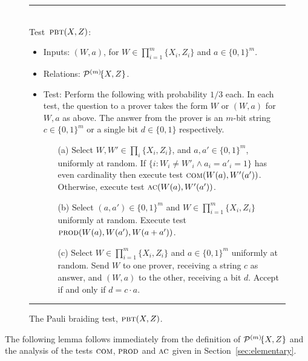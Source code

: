 \begin{figure}[H]
\rule[1ex]{\textwidth}{0.5pt}\\
\justifying
Test~$\textsc{pbt}(X,Z)$: %
\begin{itemize}
\item Inputs: $(W,a)$, for $W\in\prod_{i=1}^m\{X_i,Z_i\}$ and $a\in\{0,1\}^m$.
\item Relations: $\mathcal{P}^{(m)}\!\{X,Z\}$.  
\item Test: Perform the following with probability $1/3$ each. In each test, the question to a prover takes the form $W$ or $(W,a)$ for $W,a$ as above. The answer from the prover is an $m$-bit string $c\in\{0,1\}^m$ or a single bit $d\in\{0,1\}$ respectively.
\begin{enumerate}
\item[(a)] Select $W,W'\in \prod_i \{X_i,Z_i\}$, and $a,a'\in\{0,1\}^m$, uniformly at random. If $\{i: W_i\neq W'_i \wedge a_i=a'_i=1\}$ has even cardinality then execute test $\textsc{com}(W(a),W'(a'))$. Otherwise, execute test $\textsc{ac}(W(a),W'(a'))$. 
\item[(b)] Select $(a,a')\in\{0,1\}^m$ and $W\in\prod_{i=1}^m\{X_i,Z_i\}$ uniformly at random. Execute test $\textsc{prod}(W(a),W(a'),W(a+a'))$. 
\item[(c)] Select $W\in\prod_{i=1}^m\{X_i,Z_i\}$ and $a\in\{0,1\}^m$ uniformly at random. Send $W$ to one prover, receiving a string $c$ as answer, and $(W,a)$ to the other, receiving a bit $d$. Accept if and only if $d=c\cdot a$.  
\end{enumerate}
\end{itemize}
\rule[2ex]{\textwidth}{0.5pt}\vspace{-.5cm}
\caption{The Pauli braiding test, $\textsc{pbt}(X,Z)$.}
\label{fig:pbt}
\end{figure}

The following lemma follows immediately from the definition of $\mathcal{P}^{(m)}\!\{X,Z\}$ and the analysis of the tests $\textsc{com}$, $\textsc{prod}$ and $\textsc{ac}$ given in Section~\ref{sec:elementary}. %

